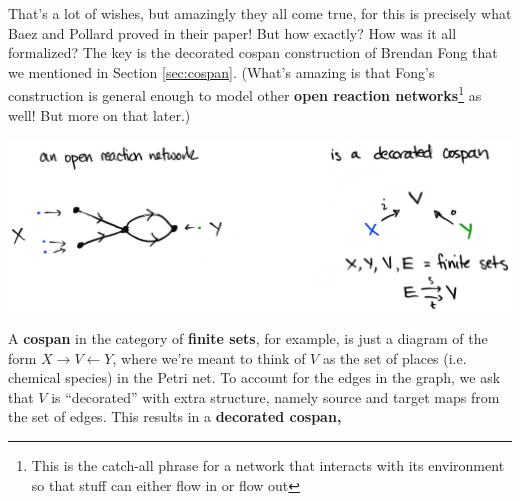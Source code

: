 \documentclass{tufte-handout-tai}
\theoremstyle{plain}
\theoremstyle{definition}
\theoremstyle{remark}
\begin{document}
That's a lot of wishes, but amazingly they all come true, for this is precisely what Baez and Pollard proved in their paper! But how exactly? How was it all formalized? The key is the decorated cospan construction of Brendan Fong that we mentioned in Section \ref{sec:cospan}. (What's amazing is that Fong's construction is general enough to model other \textbf{open reaction networks}\footnote[][-2cm]{This is the catch-all phrase for a network that interacts with its environment so that stuff can either flow in or flow out} as well! But more on that later.)
\begin{center}
\includegraphics{dcospan.jpg}
\end{center}
A \textbf{cospan} in the category of \textbf{finite sets}, for example, is just a diagram of the form $X\to V\leftarrow Y$, where we're meant to think of $V$ as the set of places (i.e. chemical species) in the Petri net.
To account for the edges in the graph, we ask that $V$ is ``decorated'' with extra structure, namely source and target maps from the set of edges. This results in a \textbf{decorated cospan,}
\end{document}
